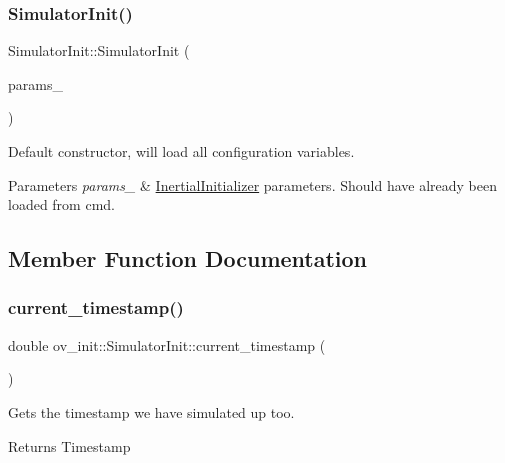 \subsubsection{\texorpdfstring{Simulator\+Init()}{SimulatorInit()}}
{\footnotesize\ttfamily Simulator\+Init\+::\+Simulator\+Init (\begin{DoxyParamCaption}\item[{\hyperlink{structov__init_1_1InertialInitializerOptions}{Inertial\+Initializer\+Options} \&}]{params\+\_\+ }\end{DoxyParamCaption})}



Default constructor, will load all configuration variables. 


\begin{DoxyParams}{Parameters}
{\em params\+\_\+} & \hyperlink{classov__init_1_1InertialInitializer}{Inertial\+Initializer} parameters. Should have already been loaded from cmd. \\
\hline
\end{DoxyParams}


\subsection{Member Function Documentation}
\mbox{\label{classov__init_1_1SimulatorInit_aca29b02e15f68526724d2dae56d2f756}} 
\subsubsection{\texorpdfstring{current\+\_\+timestamp()}{current\_timestamp()}}
{\footnotesize\ttfamily double ov\+\_\+init\+::\+Simulator\+Init\+::current\+\_\+timestamp (\begin{DoxyParamCaption}{ }\end{DoxyParamCaption})\hspace{0.3cm}{\ttfamily [inline]}}



Gets the timestamp we have simulated up too. 

\begin{DoxyReturn}{Returns}
Timestamp 
\end{DoxyReturn}
\mbox{\label{classov__init_1_1SimulatorInit_a352ee444f38cb6689e37ac83e30c7a68}} 
